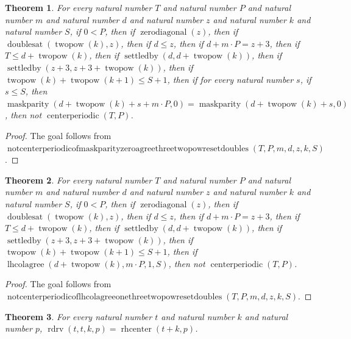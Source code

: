 \documentclass[11pt]{article}
\newtheorem{theorem}{Theorem}[section]
\theoremstyle{definition}
\begin{document}
\begin{theorem}
\label{ll:paper:not-centerperiodic-of-maskparity-zero-agree-three-twopow-reset-doubles}
For every natural number \(T\) and natural number \(P\) and natural number \(m\) and natural number \(d\) and natural number \(z\) and natural number \(k\) and natural number \(S\), if \(0 < P\), then if \(\operatorname{zerodiagonal}(z)\), then if \(\operatorname{doublesat}(\operatorname{twopow}(k), z)\), then if \(d \le z\), then if \(d + m \cdot P = z + 3\), then if \(T \le d + \operatorname{twopow}(k)\), then if \(\operatorname{settledby}(d, d + \operatorname{twopow}(k))\), then if \(\operatorname{settledby}(z + 3, z + 3 + \operatorname{twopow}(k))\), then if \(\operatorname{twopow}(k) + \operatorname{twopow}(k + 1) \le S + 1\), then if for every natural number \(s\), if \(s \le S\), then \(\operatorname{maskparity}(d + \operatorname{twopow}(k) + s + m \cdot P, 0) = \operatorname{maskparity}(d + \operatorname{twopow}(k) + s, 0)\), then not \(\operatorname{centerperiodic}(T, P)\).
\end{theorem}
\begin{proof}
The goal follows from \(\operatorname{notcenterperiodicofmaskparityzeroagreethreetwopowresetdoubles}(T, P, m, d, z, k, S)\).
\end{proof}
\begin{theorem}
\label{ll:paper:not-centerperiodic-of-lhcolagree-one-three-twopow-reset-doubles}
For every natural number \(T\) and natural number \(P\) and natural number \(m\) and natural number \(d\) and natural number \(z\) and natural number \(k\) and natural number \(S\), if \(0 < P\), then if \(\operatorname{zerodiagonal}(z)\), then if \(\operatorname{doublesat}(\operatorname{twopow}(k), z)\), then if \(d \le z\), then if \(d + m \cdot P = z + 3\), then if \(T \le d + \operatorname{twopow}(k)\), then if \(\operatorname{settledby}(d, d + \operatorname{twopow}(k))\), then if \(\operatorname{settledby}(z + 3, z + 3 + \operatorname{twopow}(k))\), then if \(\operatorname{twopow}(k) + \operatorname{twopow}(k + 1) \le S + 1\), then if \(\operatorname{lhcolagree}(d + \operatorname{twopow}(k), m \cdot P, 1, S)\), then not \(\operatorname{centerperiodic}(T, P)\).
\end{theorem}
\begin{proof}
The goal follows from \(\operatorname{notcenterperiodicoflhcolagreeonethreetwopowresetdoubles}(T, P, m, d, z, k, S)\).
\end{proof}
\begin{theorem}
\label{ll:paper:rdrv-diag-eq-rhcenter}
For every natural number \(t\) and natural number \(k\) and natural number \(p\), \(\operatorname{rdrv}(t, t, k, p) = \operatorname{rhcenter}(t + k, p)\).
\end{theorem}
\end{document}
